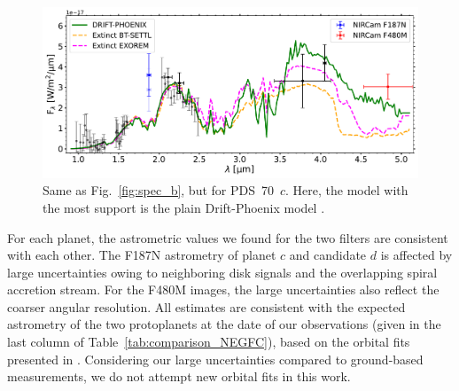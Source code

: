\documentclass[longauth]{aa}
\begin{document}
\begin{figure}[!t]
\centering
\includegraphics[width=\textwidth]{Fig3_v7.pdf}
\caption{Same as Fig.~\ref{fig:spec_b}, but for PDS~70~$c$. %
Here, the model with the most support is the plain Drift-Phoenix model \citep[details in][]{Wang2021}. %
}
\label{fig:spec_c}
\end{figure}

For each planet, the astrometric values we found for the two filters are consistent with each other. The F187N astrometry of planet %
$c$ and candidate $d$ is affected by large uncertainties owing to neighboring disk signals and the overlapping spiral accretion stream. For the F480M images, the large uncertainties also reflect the coarser angular resolution. All estimates are consistent with the expected astrometry of the two protoplanets at the date of our observations (given in the last column of Table~\ref{tab:comparison_NEGFC}), based on the orbital fits presented in \citet{Wang2021}. %
Considering our large uncertainties compared to ground-based measurements, we do not attempt new orbital fits %
in this work. %
\end{document}
